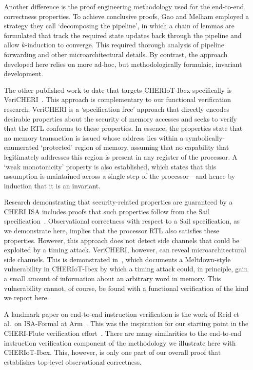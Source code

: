 \documentclass[10pt,conference]{IEEEtran}
\begin{document}
Another difference is the proof engineering methodology used
for the end-to-end correctness properties. To achieve conclusive proofs,
Gao and Melham employed a strategy they call `decomposing the pipeline', in
which a chain of lemmas are formulated that track the required state
updates back through the pipeline and allow $k$-induction to converge. This
required thorough analysis of pipeline forwarding and other
microarchitectural details. By contrast, the approach developed here relies
on more ad-hoc, but methodologically formulaic, invariant
development.

\medskip

The other published work to date that targets CHERIoT-Ibex specifically is
VeriCHERI~\cite{vericheri2024}.  This approach is complementary to our
functional verification research; VeriCHERI is a `specification free'
approach that directly encodes desirable properties about the security of
memory accesses and seeks to verify that the RTL conforms to these
properties. In essence, the properties state that no memory transaction is
issued whose address lies within a symbolically-enumerated `protected'
region of memory, assuming that no capability that legitimately addresses
this region is present in any register of the processor. A `weak
monotonicity' property is also established, which states that this
assumption is maintained across a single step of the processor---and hence
by induction that it is an invariant.

Research demonstrating that security-related properties are guaranteed by a
CHERI ISA includes proofs that such properties follow from the Sail
specification~\cite{cheriot-sail-properties}.  Observational correctness
with respect to a Sail specification, as we demonstrate here, implies that
the processor RTL also satisfies these properties.
However, this approach does not detect side channels that could be
exploited by a timing attack. VeriCHERI, however, can reveal
microarchitectural side channels. This is demonstrated
in~\cite{vericheri2024}, which documents a Meltdown-style vulnerability in
CHERIoT-Ibex by which a timing attack could, in principle, gain a small
amount of information about an arbitrary word in memory. This vulnerability
cannot, of course, be found with a functional verification of the kind we
report here.

\medskip

A landmark paper on end-to-end instruction verification is the work of Reid
et al.~on ISA-Formal at Arm~\cite{Reid-2016-EEV}. This was the inspiration
for our starting point in the CHERI-Flute verification
effort~\cite{Gao:2021:EFV}.  There are many similarities to the
end-to-end instruction verification component of the methodology we
illustrate here with CHERIoT-Ibex.  This, however, is only one part of our
overall proof that establishes top-level observational correctness.
\end{document}

